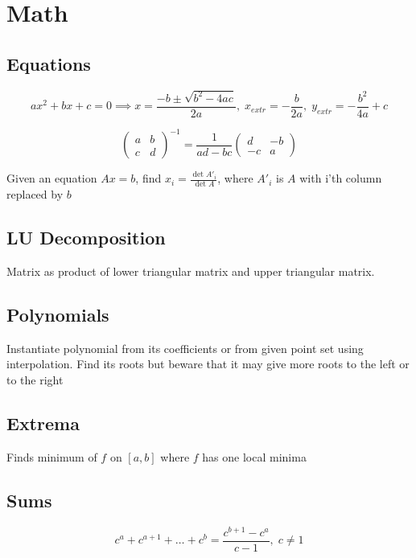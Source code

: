 \section{Math}

\subsection{Equations}

$$
ax^2 + bx + c = 0
\implies
x = \frac{-b \pm \sqrt{b^2 - 4ac}}{2a}
,\;
x_{extr} = -\frac{b}{2a}
,\;
y_{extr} = -\frac{b^2}{4a} + c
$$

$$
\begin{pmatrix}
  a & b \\
  c & d
\end{pmatrix}^{-1}
=
\frac1{ad - bc}
\begin{pmatrix}
  d & -b \\
  -c & a
\end{pmatrix}
$$

Given an equation $Ax = b$, find $x_i = \frac{\det A'_i}{\det A}$, where $A'_i$ is $A$ with i'th column replaced by $b$

\subsection{LU Decomposition}
Matrix as product of lower triangular matrix and upper triangular matrix. 

\subsection{Polynomials}
Instantiate polynomial from its coefficients or from given point set using interpolation.
Find its roots but beware that it may give more roots to the left or to the right

\subsection{Extrema}

Finds minimum of $f$ on $[a, b]$ where $f$ has one local minima

\subsection{Sums}

$$c^a + c^{a+1} + \ldots + c^b = \frac{c^{b+1} - c^a}{c - 1},\; c \ne 1$$

